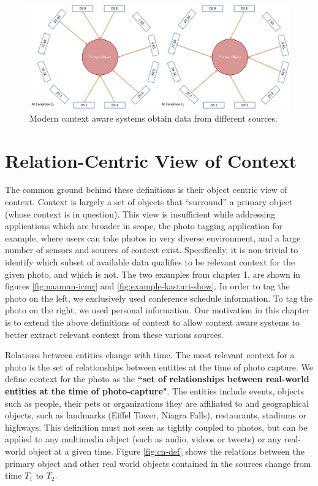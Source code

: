 \begin{figure}[t]
\centering
\includegraphics[width=\textwidth]{media/chapter2/va.png}
\caption{Modern context aware systems obtain data from different sources.}
\label{fig:va-def}
\end{figure}

\section{Relation-Centric View of Context}

The common ground behind these definitions is their object centric view of context. Context is largely a set of objects that ``surround'' a primary object (whose context is in question). This view is insufficient while addressing applications which are broader in scope, the photo tagging application for example, where users can take photos in very diverse environment, and a large number of sensors and sources of context exist. Specifically, it is non-trivial to identify which subset of available data qualifies to be relevant context for the given photo, and which is not. The two examples from chapter 1, are shown in figures \ref{fig:naaman-icmr} and \ref{fig:example-kasturi-show}. In order to tag the photo on the left, we exclusively used conference schedule information. To tag the photo on the right, we used personal information. Our motivation in this chapter is to extend the above definitions of context to allow context aware systems to better extract relevant context from these various sources.

Relations between entities change with time. The most relevant context for a photo is the set of relationships between entities at the time of photo capture. We define context for the photo as the \textbf{``set of relationships between real-world entities at the time of photo-capture"}. The entities include events, objects such as people, their pets or organizations they are affiliated to and geographical objects, such as landmarks (Eiffel Tower, Niagra Falls), restaurants, stadiums or highways. This definition must not seen as tightly coupled to photos, but can be applied to any multimedia object (such as audio, videos or tweets) or any real-world object at a given time. Figure \ref{fig:cn-def} shows the relations between the primary object and other real world objects contained in the sources change from time $T_1$ to $T_2$.

